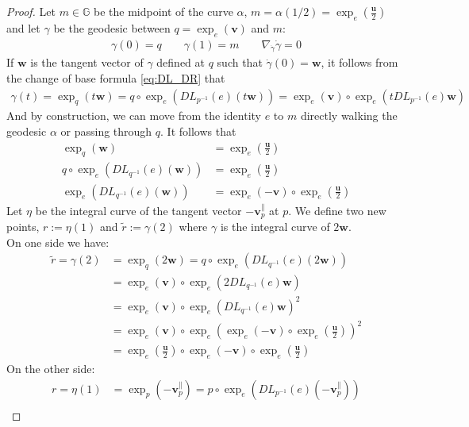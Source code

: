 \begin{proof}
	Let $m \in \mathbb{G}$ be the midpoint of the curve $\alpha$, $m = \alpha(1/2) = \exp_{e}(\frac{\mathbf{u}}{2})$ and let $\gamma$ be the geodesic between $q = \exp_{e}(\mathbf{v}) $ and $m$:
	\begin{align*}
	\gamma(0) = q 
	\qquad
	\gamma(1) = m
	\qquad
	\nabla_{\dot{\gamma}} \dot{\gamma} = 0
	\end{align*}
	If $\mathbf{w}$ is the tangent vector of $\gamma$ defined at $q$ such that $\dot{\gamma}(0) = \mathbf{w}$, it follows from the change of base formula \ref{eq:DL_DR} that 
	\begin{align*}
	\gamma(t) = \exp_{q}(t\mathbf{w}) 
	= 
	q \circ \exp_{e}(DL_{p^{-1}}(e)(t\mathbf{w})) 
	= 
	\exp_{e}(\mathbf{v})  \circ \exp_{e}(t DL_{p^{-1}}(e)\mathbf{w}) 
	\end{align*}
	And by construction, we can move from the identity $e$ to $m$ directly walking the geodesic $\alpha$ or passing through $q$. It follows that
	\begin{align*}
		\exp_{q}(\mathbf{w}) &= \exp_{e}(\frac{\mathbf{u}}{2})\\
		q\circ \exp_{e}(DL_{q^{-1}}(e)(\mathbf{w})) &= \exp_{e}(\frac{\mathbf{u}}{2})\\
		\exp_{e}(DL_{q^{-1}}(e)(\mathbf{w})) &= \exp_{e}(-\mathbf{v})\circ\exp_{e}(\frac{\mathbf{u}}{2})
	\end{align*}
	Let $\eta$ be the integral curve of the tangent vector $-\mathbf{v}_{p}^{\parallel}$ at $p$. We define two new points, $r := \eta(1)$ and $\tilde{r} :=\gamma(2)$ where $\gamma$ is the integral curve of $2\mathbf{w}$.\\
	On one side we have:
	\begin{align*}
		\tilde{r} = \gamma(2) &= \exp_q(2\mathbf{w}) = q \circ\exp_{e}(DL_{q^{-1}}(e)(2\mathbf{w})) \\
		&= \exp_{e}(\mathbf{v})\circ\exp_{e}(2DL_{q^{-1}}(e)\mathbf{w}) \\
		&= \exp_{e}(\mathbf{v})\circ\exp_{e}(DL_{q^{-1}}(e)\mathbf{w})^2 \\
		&= \exp_{e}(\mathbf{v})\circ\exp_{e}(\exp_{e}(-\mathbf{v})\circ\exp_{e}(\frac{\mathbf{u}}{2}))^2 \\
		&= \exp_{e}(\frac{\mathbf{u}}{2})\circ \exp_{e}(-\mathbf{v})\circ\exp_{e}(\frac{\mathbf{u}}{2})
	\end{align*}
	On the other side:
	\begin{align*}
		r = \eta(1) &= \exp_{p}(-\mathbf{v}_{p}^{\parallel}) = p \circ\exp_{e}(DL_{p^{-1}}(e)(-\mathbf{v}_{p}^{\parallel})) \\

\end{align*}
\end{proof}
